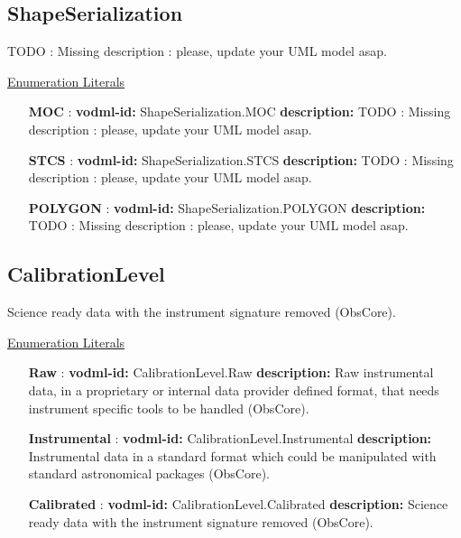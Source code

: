   \subsection{ShapeSerialization}
  \label{sect:ShapeSerialization}

  TODO : Missing description : please, update your UML model asap.

  \noindent \underline{Enumeration Literals}
  \vspace{-\parsep}
  \small
  \begin{itemize}

    \item[\textbf{MOC}]: \textbf{vodml-id:} ShapeSerialization.MOC \newline
          \textbf{description:} TODO : Missing description : please, update your UML model asap.
    \item[\textbf{STCS}]: \textbf{vodml-id:} ShapeSerialization.STCS \newline
          \textbf{description:} TODO : Missing description : please, update your UML model asap.
    \item[\textbf{POLYGON}]: \textbf{vodml-id:} ShapeSerialization.POLYGON \newline
          \textbf{description:} TODO : Missing description : please, update your UML model asap.
  \end{itemize}
  \normalsize


  \subsection{CalibrationLevel}
  \label{sect:CalibrationLevel}

  Science ready data with the instrument signature removed (ObsCore).

  \noindent \underline{Enumeration Literals}
  \vspace{-\parsep}
  \small
  \begin{itemize}

    \item[\textbf{Raw}]: \textbf{vodml-id:} CalibrationLevel.Raw \newline
          \textbf{description:} Raw instrumental data, in a proprietary or internal data provider defined format, that needs instrument specific tools to be handled (ObsCore).
    \item[\textbf{Instrumental}]: \textbf{vodml-id:} CalibrationLevel.Instrumental \newline
          \textbf{description:} Instrumental data in a standard format which could be manipulated with standard astronomical packages (ObsCore).
    \item[\textbf{Calibrated}]: \textbf{vodml-id:} CalibrationLevel.Calibrated \newline
          \textbf{description:} Science ready data with the instrument signature removed (ObsCore).
  \end{itemize}
  \normalsize


